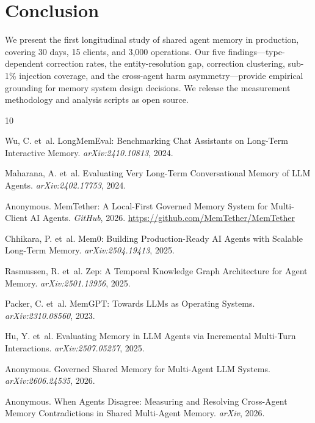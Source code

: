 \documentclass[11pt]{article}
\begin{document}
\section{Conclusion}

\label{sec:conclusion}

We present the first longitudinal study of shared agent memory in production, covering 30 days, 15 clients, and 3,000 operations. Our five findings---type-dependent correction rates, the entity-resolution gap, correction clustering, sub-1\% injection coverage, and the cross-agent harm asymmetry---provide empirical grounding for memory system design decisions. We release the measurement methodology and analysis scripts as open source.

\begin{thebibliography}{10}

Wu, C. et~al.
\newblock LongMemEval: Benchmarking Chat Assistants on Long-Term Interactive Memory. \newblock \emph{arXiv:2410.10813}, 2024.

Maharana, A. et~al.
\newblock Evaluating Very Long-Term Conversational Memory of LLM Agents.
\newblock \emph{arXiv:2402.17753}, 2024.

Anonymous.
\newblock MemTether: A Local-First Governed Memory System for Multi-Client AI Agents.
\newblock \emph{GitHub}, 2026. \url{https://github.com/MemTether/MemTether}

Chhikara, P. et~al.
\newblock Mem0: Building Production-Ready AI Agents with Scalable Long-Term Memory.
\newblock \emph{arXiv:2504.19413}, 2025.

Rasmussen, R. et~al.
\newblock Zep: A Temporal Knowledge Graph Architecture for Agent Memory.
\newblock \emph{arXiv:2501.13956}, 2025.

Packer, C. et~al.
\newblock MemGPT: Towards LLMs as Operating Systems.
\newblock \emph{arXiv:2310.08560}, 2023.

Hu, Y. et~al.
\newblock Evaluating Memory in LLM Agents via Incremental Multi-Turn Interactions.
\newblock \emph{arXiv:2507.05257}, 2025.

Anonymous.
\newblock Governed Shared Memory for Multi-Agent LLM Systems.
\newblock \emph{arXiv:2606.24535}, 2026.

Anonymous.
\newblock When Agents Disagree: Measuring and Resolving Cross-Agent Memory Contradictions in Shared Multi-Agent Memory.
\newblock \emph{arXiv}, 2026.
\end{thebibliography}
\end{document}
